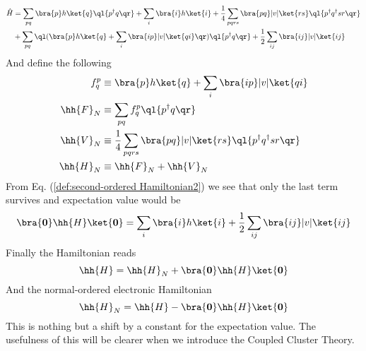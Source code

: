 \begin{align}
 \hat{H} &= \sum_{pq} \bra{p}h\ket{q} \ql \{ p^{\dagger}q \qr \} + \sum_{i}\bra{i}h\ket{i} + \frac{1}{4} \sum_{pqrs} \bra{pq}|v|\ket{rs} \ql \{ p^{\dagger}q^{\dagger}sr \qr \}   \nonumber \\ 
& + \sum_{pq} \ql (  \bra{p}h\ket{q} + \sum_{i}\bra{ip}|v|\ket{qi}  \qr ) \ql \{ p^{\dagger} q \qr \} + \frac{1}{2} \sum_{ij} \bra{ij}|v|\ket{ij}
 \label{def:second-ordered Hamiltonian2}
\end{align}
%
And define the following
\begin{align}
f_q^p         &\equiv  \bra{p}h\ket{q} + \sum_{i}\bra{ip}|v|\ket{qi}  \label{def:f_p^q} \\
\hh{F}_N      &\equiv  \sum_{pq} f_q^p  \ql \{ p^{\dagger} q \qr \}    \label{def:F_N}     \\
\hh{V}_N      &\equiv  \frac{1}{4} \sum_{pqrs} \bra{pq}|v|\ket{rs} \ql \{ p^{\dagger}q^{\dagger}sr \qr \}\label{def:V_N}  \\
\hh{H}_N      &\equiv  \hh{F}_N + \hh{V}_N \label{def:H_N} 
\end{align}
%
From Eq. (\ref{def:second-ordered Hamiltonian2}) we see that only the last term survives and expectation value would be
\begin{equation}
\bra{\bf 0}\hh{H}\ket{\bf 0} = \sum_i \bra{i}h\ket{i} + \frac{1}{2} \sum_{ij} \bra{ij}|v|\ket{ij} 
 \label{eq:second-qunatized reference expectation value}
\end{equation}
%
Finally the Hamiltonian reads
\begin{equation}
\hh{H} = \hh{H}_N + \bra{\bf 0}\hh{H}\ket{\bf 0}
 \label{eq:final normal ordered hamiltonian}
\end{equation}
%
And the normal-ordered electronic Hamiltonian 
\begin{equation}
\hh{H}_N = \hh{H} - \bra{\bf 0}\hh{H}\ket{\bf 0}
 \label{eq:normal-ordered hamiltonian}
\end{equation}
%
This is nothing but a shift by a constant for the expectation value. The usefulness of this will be clearer when we introduce the Coupled Cluster Theory.


